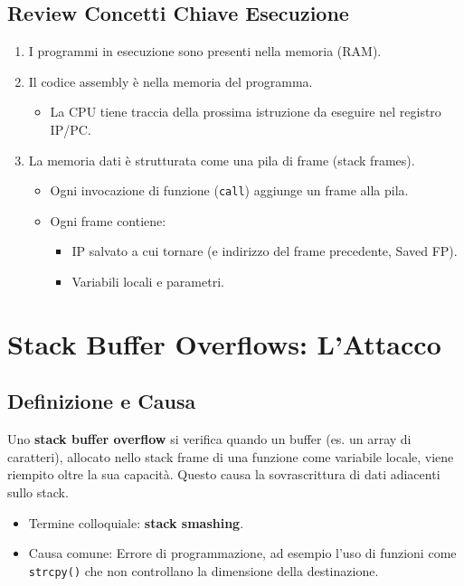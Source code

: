 \documentclass{article}
\begin{document}
\subsection{Review Concetti Chiave Esecuzione}
\begin{enumerate}
    \item I programmi in esecuzione sono presenti nella memoria (RAM).
    \item Il codice assembly è nella memoria del programma.
        \begin{itemize}
            \item La CPU tiene traccia della prossima istruzione da eseguire nel registro IP/PC.
        \end{itemize}
    \item La memoria dati è strutturata come una pila di frame (stack frames).
        \begin{itemize}
            \item Ogni invocazione di funzione (\texttt{call}) aggiunge un frame alla pila.
            \item Ogni frame contiene:
                \begin{itemize}
                    \item IP salvato a cui tornare (e indirizzo del frame precedente, Saved FP).
                    \item Variabili locali e parametri.
                \end{itemize}
        \end{itemize}
\end{enumerate}


\newpage
\section{Stack Buffer Overflows: L'Attacco}

\subsection{Definizione e Causa}
Uno \textbf{stack buffer overflow} si verifica quando un buffer (es. un array di caratteri), allocato nello stack frame di una funzione come variabile locale, viene riempito oltre la sua capacità. Questo causa la sovrascrittura di dati adiacenti sullo stack.
\begin{itemize}
    \item Termine colloquiale: \textbf{stack smashing}.
    \item Causa comune: Errore di programmazione, ad esempio l'uso di funzioni come \texttt{strcpy()} che non controllano la dimensione della destinazione.
\end{itemize}
\end{document}
